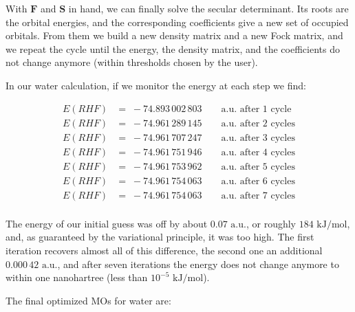\documentclass[
  english,
  9pt,
]{extbook}
\theoremstyle{definition}
\theoremstyle{definition}
\theoremstyle{definition}
\theoremstyle{definition}
\theoremstyle{remark}
\begin{document}
With \(\mathbf{F}\) and \(\mathbf{S}\) in hand, we can finally solve the secular determinant. Its roots are the orbital energies, and the corresponding coefficients give a new set of occupied orbitals. From them we build a new density matrix and a new Fock matrix, and we repeat the cycle until the energy, the density matrix, and the coefficients do not change anymore (within thresholds chosen by the user).

In our water calculation, if we monitor the energy at each step we find:

\begin{equation}
\begin{aligned}
E(RHF) &= \; -74.893\,002\,803\qquad\text{a.u. after 1 cycle} \\
E(RHF) &= \; -74.961\,289\,145\qquad\text{a.u. after 2 cycles} \\
E(RHF) &= \; -74.961\,707\,247\qquad\text{a.u. after 3 cycles} \\
E(RHF) &= \; -74.961\,751\,946\qquad\text{a.u. after 4 cycles} \\
E(RHF) &= \; -74.961\,753\,962\qquad\text{a.u. after 5 cycles} \\
E(RHF) &= \; -74.961\,754\,063\qquad\text{a.u. after 6 cycles} \\
E(RHF) &= \; -74.961\,754\,063\qquad\text{a.u. after 7 cycles} \\
\end{aligned}
\label{eq:h2oenergies}
\end{equation}

The energy of our initial guess was off by about \(0.07\text{ a.u.}\), or roughly \(184\text{ kJ/mol}\), and, as guaranteed by the variational principle, it was too high. The first iteration recovers almost all of this difference, the second one an additional \(0.000\,42\text{ a.u.}\), and after seven iterations the energy does not change anymore to within one nanohartree (less than \(10^{-5}\text{ kJ/mol}\)).

The final optimized MOs for water are:
\end{document}
